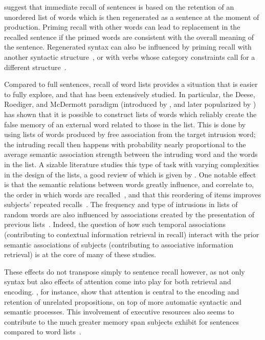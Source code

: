 \begin{new}

\citet{potter_regeneration_1990} suggest that immediate recall of sentences is based on the retention of an unordered list of words which is then regenerated as a sentence at the moment of production.
Priming recall with other words can lead to replacement in the recalled sentence if the primed words are consistent with the overall meaning of the sentence.
Regenerated syntax can also be influenced by priming recall with another syntactic structure~\citep{potter_syntactic_1998}, or with verbs whose category constraints call for a different structure~\citep{lombardi_regeneration_1992}.

Compared to full sentences, recall of word lists provides a situation that is easier to fully explore, and that has been extensively studied.
In particular, the Deese, Roediger, and McDermott paradigm (introduced by \citealp{deese_prediction_1959}, and later popularized by \citealp{roediger_creating_1995}) has shown that it is possible to construct lists of words which reliably create the false memory of an external word related to those in the list.
This is done by using lists of words produced by free association from the target intrusion word;
the intruding recall then happens with probability nearly proportional to the average semantic association strength between the intruding word and the words in the list.
A sizable literature studies this type of task with varying complexities in the design of the lists, a good review of which is given by \citet{zaromb_temporal_2006}.
One notable effect is that the semantic relations between words greatly influence, and correlate to, the order in which words are recalled~\citep{tulving_subjective_1962,howard_when_2002}, and that this reordering of items improves subjects' repeated recalls~\citep{tulving_subjective_1966}.
The frequency and type of intrusions in lists of random words are also influenced by associations created by the presentation of previous lists~\citep{zaromb_temporal_2006}.
Indeed, the question of how such temporal associations (contributing to contextual information retrieval in recall) interact with the prior semantic associations of subjects (contributing to associative information retrieval) is at the core of many of these studies.

These effects do not transpose simply to sentence recall however, as not only syntax but also effects of attention come into play for both retrieval and encoding.
\citet{jefferies_automatic_2004}, for instance, show that attention is central to the encoding and retention of unrelated propositions, on top of more automatic syntactic and semantic processes.
This involvement of executive resources also seems to contribute to the much greater memory span subjects exhibit for sentences compared to word lists~\citep[see][again, for more details]{jefferies_automatic_2004}.

\end{new}

